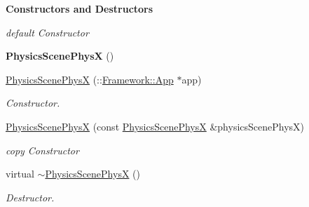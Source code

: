 \begin{Indent}{\bf Constructors and Destructors}\par
{\em \label{_amgrp64fb2b8a2107864a2f56d3f7cc47f3aa}
 default Constructor }\begin{DoxyCompactItemize}
\item 
\hypertarget{classContent_1_1Physics_1_1PhysicsScenePhysX_ae834eebaff5f7e23c84e0eb3366386c1}{
{\bfseries PhysicsScenePhysX} ()}
\label{classContent_1_1Physics_1_1PhysicsScenePhysX_ae834eebaff5f7e23c84e0eb3366386c1}

\item 
\hypertarget{classContent_1_1Physics_1_1PhysicsScenePhysX_aaa4e51b84978bd8aa68c256ba965373f}{
\hyperlink{classContent_1_1Physics_1_1PhysicsScenePhysX_aaa4e51b84978bd8aa68c256ba965373f}{PhysicsScenePhysX} (::\hyperlink{classFramework_1_1App}{Framework::App} $\ast$app)}
\label{classContent_1_1Physics_1_1PhysicsScenePhysX_aaa4e51b84978bd8aa68c256ba965373f}

\begin{DoxyCompactList}\small\item\em Constructor. \item\end{DoxyCompactList}\item 
\hypertarget{classContent_1_1Physics_1_1PhysicsScenePhysX_ae87a6a3fead348a6183fc971f46598b7}{
\hyperlink{classContent_1_1Physics_1_1PhysicsScenePhysX_ae87a6a3fead348a6183fc971f46598b7}{PhysicsScenePhysX} (const \hyperlink{classContent_1_1Physics_1_1PhysicsScenePhysX}{PhysicsScenePhysX} \&physicsScenePhysX)}
\label{classContent_1_1Physics_1_1PhysicsScenePhysX_ae87a6a3fead348a6183fc971f46598b7}

\begin{DoxyCompactList}\small\item\em copy Constructor \item\end{DoxyCompactList}\item 
\hypertarget{classContent_1_1Physics_1_1PhysicsScenePhysX_ab50107623746623ad7df9d52216edee7}{
virtual \hyperlink{classContent_1_1Physics_1_1PhysicsScenePhysX_ab50107623746623ad7df9d52216edee7}{$\sim$PhysicsScenePhysX} ()}
\label{classContent_1_1Physics_1_1PhysicsScenePhysX_ab50107623746623ad7df9d52216edee7}

\begin{DoxyCompactList}\small\item\em Destructor. \item\end{DoxyCompactList}\end{DoxyCompactItemize}
\end{Indent}
